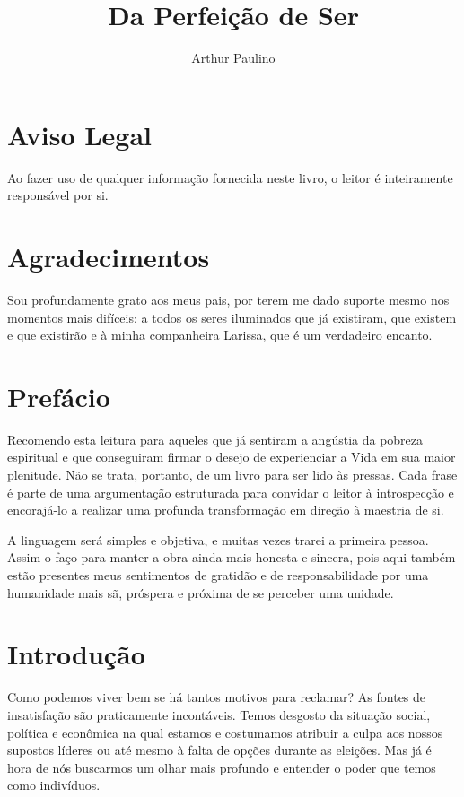 \documentclass[oneside, 12pt]{book}
\title{Da Perfeição de Ser}
\author{Arthur Paulino}
\date{}
\begin{document}
\maketitle

\chapter*{Aviso Legal}
\thispagestyle{empty}

Ao fazer uso de qualquer informação fornecida neste livro, o leitor é inteiramente responsável por si.

\chapter*{Agradecimentos}
\thispagestyle{empty}

Sou profundamente grato aos meus pais, por terem me dado suporte mesmo nos momentos mais difíceis; a todos os seres iluminados que já existiram, que existem e que existirão e à minha companheira Larissa, que é um verdadeiro encanto.

\tableofcontents
\thispagestyle{empty}

\chapter*{Prefácio}

Recomendo esta leitura para aqueles que já sentiram a angústia da pobreza espiritual e que conseguiram firmar o desejo de experienciar a Vida em sua maior plenitude. Não se trata, portanto, de um livro para ser lido às pressas. Cada frase é parte de uma argumentação estruturada para convidar o leitor à introspecção e encorajá-lo a realizar uma profunda transformação em direção à maestria de si.

A linguagem será simples e objetiva, e muitas vezes trarei a primeira pessoa. Assim o faço para manter a obra ainda mais honesta e sincera, pois aqui também estão presentes meus sentimentos de gratidão e de responsabilidade por uma humanidade mais sã, próspera e próxima de se perceber uma unidade.

\chapter*{Introdução}

Como podemos viver bem se há tantos motivos para reclamar? As fontes de insatisfação são praticamente incontáveis. Temos desgosto da situação social, política e econômica na qual estamos e costumamos atribuir a culpa aos nossos supostos líderes ou até mesmo à falta de opções durante as eleições. Mas já é hora de nós buscarmos um olhar mais profundo e entender o poder que temos como indivíduos.
\end{document}
